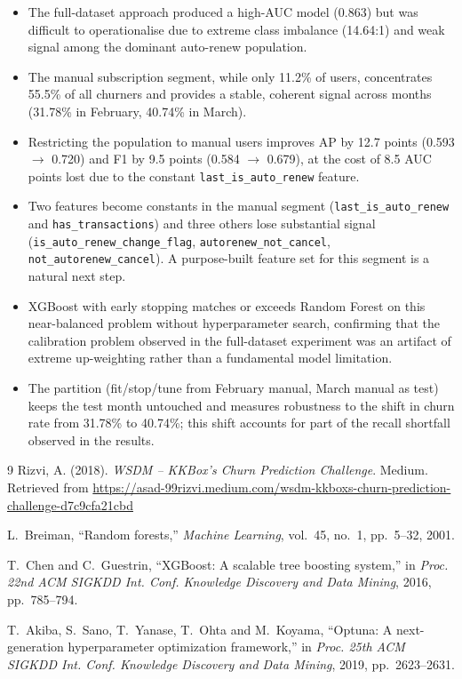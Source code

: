 \documentclass{article}
\begin{document}
\begin{itemize}
    \item The full-dataset approach produced a high-AUC model (0.863) but was difficult to operationalise due to extreme class imbalance (14.64:1) and weak signal among the dominant auto-renew population.
    \item The manual subscription segment, while only 11.2\% of users, concentrates 55.5\% of all churners and provides a stable, coherent signal across months (31.78\% in February, 40.74\% in March).
    \item Restricting the population to manual users improves AP by 12.7 points (0.593 $\to$ 0.720) and F1 by 9.5 points (0.584 $\to$ 0.679), at the cost of 8.5 AUC points lost due to the constant \texttt{last\_is\_auto\_renew} feature.
    \item Two features become constants in the manual segment (\texttt{last\_is\_auto\_renew} and \texttt{has\_transactions}) and three others lose substantial signal (\texttt{is\_auto\_renew\_change\_flag}, \texttt{autorenew\_not\_cancel}, \texttt{not\_autorenew\_cancel}). A purpose-built feature set for this segment is a natural next step.
    \item XGBoost with early stopping matches or exceeds Random Forest on this near-balanced problem without hyperparameter search, confirming that the calibration problem observed in the full-dataset experiment was an artifact of extreme up-weighting rather than a fundamental model limitation.
    \item The partition (fit/stop/tune from February manual, March manual as test) keeps the test month untouched and measures robustness to the shift in churn rate from 31.78\% to 40.74\%; this shift accounts for part of the recall shortfall observed in the results.
\end{itemize}


\begin{thebibliography}{9}
Rizvi, A. (2018). \textit{WSDM -- KKBox's Churn Prediction Challenge}. Medium. Retrieved from \url{https://asad-99rizvi.medium.com/wsdm-kkboxs-churn-prediction-challenge-d7c9cfa21cbd}

L.~Breiman, ``Random forests,'' \textit{Machine Learning}, vol.~45, no.~1, pp.~5--32, 2001.

T.~Chen and C.~Guestrin, ``XGBoost: A scalable tree boosting system,'' in \textit{Proc. 22nd ACM SIGKDD Int. Conf. Knowledge Discovery and Data Mining}, 2016, pp.~785--794.

T.~Akiba, S.~Sano, T.~Yanase, T.~Ohta and M.~Koyama, ``Optuna: A next-generation hyperparameter optimization framework,'' in \textit{Proc. 25th ACM SIGKDD Int. Conf. Knowledge Discovery and Data Mining}, 2019, pp.~2623--2631.
\end{thebibliography}
\end{document}
